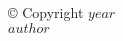 \thispagestyle{empty}
\vspace*{\fill}
\begin{center}
© Copyright $year$ \\
$author$
\end{center}
\vspace*{\fill}
\newpage